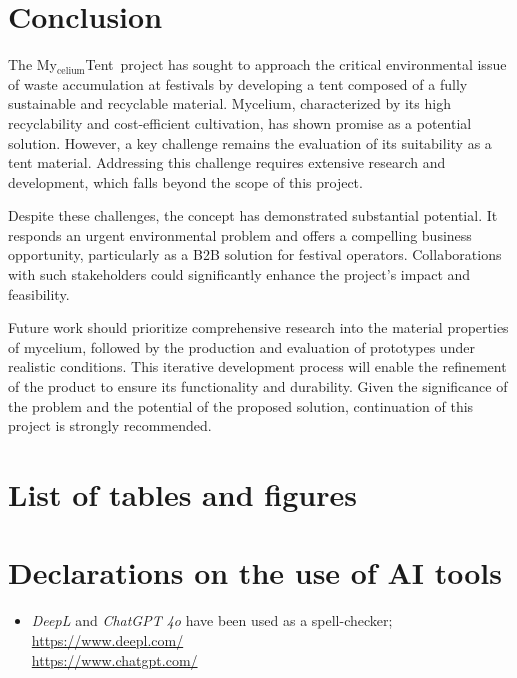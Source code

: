\documentclass{article}
\newcommand{\myc}{My$_{\text{celium}}$Tent}
\begin{document}
\section{Conclusion}
The \myc\ project has sought to approach the critical environmental issue of waste
accumulation at festivals by developing a tent composed of a fully sustainable and recyclable
material. Mycelium, characterized by its high recyclability and cost-efficient cultivation, has
shown promise as a potential solution. However, a key challenge remains the evaluation of its
suitability as a tent material. Addressing this challenge requires extensive research and
development, which falls beyond the scope of this project.

Despite these challenges, the concept has demonstrated substantial potential. It responds
an urgent environmental problem and offers a compelling business opportunity, particularly
as a B2B solution for festival operators. Collaborations with such stakeholders could
significantly enhance the project's impact and feasibility.

Future work should prioritize comprehensive research into the material properties of
mycelium, followed by the production and evaluation of prototypes under realistic
conditions. This iterative development process will enable the refinement of the
product to ensure its functionality and durability. Given the significance of the problem
and the potential of the proposed solution, continuation of this project is strongly
recommended.

\newpage
\section{List of tables and figures}
\listoftables

\listoffigures

\section{Declarations on the use of AI tools}
\begin{itemize}
    \item \textit{DeepL} and \textit{ChatGPT 4o} have been used as a spell-checker;\\
        \url{https://www.deepl.com/}\\
        \url{https://www.chatgpt.com/}
\end{itemize}

\setlength{\bibitemsep}{1.2\baselineskip}
\printbibliography[heading=none]
\end{document}
